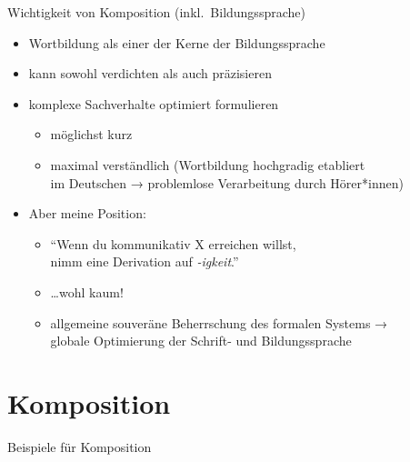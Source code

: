 \begin{frame}
  {Wichtigkeit von Komposition (inkl.\ Bildungssprache)}
  \pause
  \begin{itemize}[<+->]
    \item Wortbildung als einer der Kerne der Bildungssprache
    \item kann sowohl \alert{verdichten} als auch \alert{präzisieren}
    \Halbzeile
    \item komplexe Sachverhalte \alert{optimiert} formulieren
      \begin{itemize}[<+->]
        \item möglichst kurz
        \item maximal verständlich (Wortbildung hochgradig etabliert\\
          im Deutschen → problemlose Verarbeitung durch Hörer*innen)
      \end{itemize}
      \Halbzeile
    \item Aber meine Position: 
      \Halbzeile
      \begin{itemize}[<+->]
        \item "`Wenn du kommunikativ X erreichen willst,\\
          nimm eine Derivation auf \textit{-igkeit}."'
        \item \dots \alert{wohl kaum!}
        \item \alert{allgemeine souveräne Beherrschung des formalen Systems →\\
          globale Optimierung der Schrift- und Bildungssprache}
      \end{itemize}
  \end{itemize}
\end{frame}

\section{Komposition}

\begin{frame}
  {Beispiele für Komposition}
  \pause
  \begin{exe}
    \ex
    \begin{xlist}
      \pause
      \pause
      \pause
      \pause
      \pause
      \pause
      \pause
      \pause
    \end{xlist}
  \end{exe}
\end{frame}

